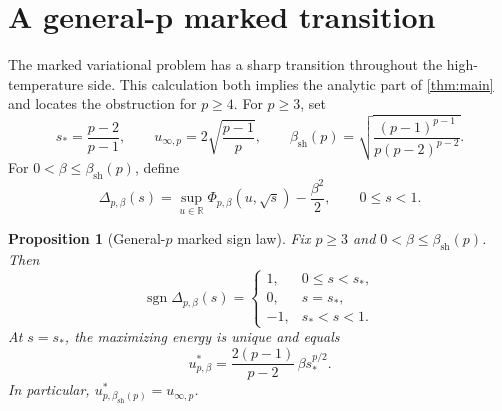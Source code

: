 \documentclass[11pt,reqno]{amsart}
\numberwithin{equation}{section}
\theoremstyle{plain}
\newtheorem{proposition}[proposition]{Proposition}
\theoremstyle{definition}
\theoremstyle{remark}
\newcommand{\R}{\mathbb R}
\newcommand{\1}{\mathbf 1}
\begin{document}
\section{A general-p marked transition}\label{sec:generalp}

The marked variational problem has a sharp transition throughout the
high-temperature side.  This calculation both implies the analytic
part of \cref{thm:main} and locates the obstruction for \(p\geq4\).
For \(p\geq3\), set
\begin{equation}\label{eq:generalThresholds}
 s_* = \frac{p-2}{p-1},
 \qquad
 u_{\infty,p}=2\sqrt{\frac{p-1}{p}},
 \qquad
 \beta_{\mathrm{sh}}(p)
 =\sqrt{\frac{(p-1)^{p-1}}{p(p-2)^{p-2}}}.
\end{equation}
For \(0<\beta\leq\beta_{\mathrm{sh}}(p)\), define
\begin{equation}\label{eq:DeltaGeneral}
 \Delta_{p,\beta}(s)
 =\sup_{u\in\R}\Phi_{p,\beta}(u,\sqrt s)-\frac{\beta^2}{2},
 \qquad 0\leq s<1.
\end{equation}

\begin{proposition}[General-\(p\) marked sign law]
\label{prop:general-p-marked}
Fix \(p\geq3\) and \(0<\beta\leq\beta_{\mathrm{sh}}(p)\).  Then
\begin{equation}\label{eq:generalSignLaw}
 \operatorname{sgn}\Delta_{p,\beta}(s)
 =\begin{cases}
  1, & 0\leq s<s_*,\\
  0, & s=s_*,\\
  -1, & s_*<s<1.
 \end{cases}
\end{equation}
At \(s=s_*\), the maximizing energy is unique and equals
\begin{equation}\label{eq:generalContactEnergy}
 u^*_{p,\beta}
 =\frac{2(p-1)}{p-2}\,\beta s_*^{p/2}.
\end{equation}
In particular,
\(u^*_{p,\beta_{\mathrm{sh}}(p)}=u_{\infty,p}\).
\end{proposition}
\end{document}
